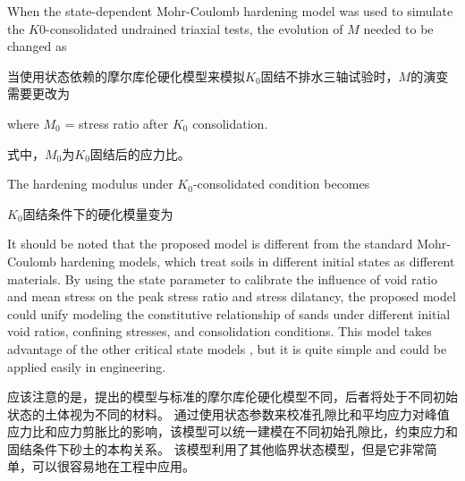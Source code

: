 \begin{ParaColumn}
    
    When the state-dependent Mohr-Coulomb hardening model was used to simulate the $K0$-consolidated undrained triaxial tests, the evolution of $M$ needed to be changed as

    \switchcolumn

    当使用状态依赖的摩尔库伦硬化模型来模拟$K_0$固结不排水三轴试验时，$M$的演变需要更改为

    \switchcolumn*

    \noindent
    where $M_0$ = stress ratio after $K_0$ consolidation.

    \switchcolumn

    \noindent
    式中，$M_0$为$K_0$固结后的应力比。

    \switchcolumn*

    The hardening modulus under $K_0$-consolidated condition becomes

    \switchcolumn

    $K_0$固结条件下的硬化模量变为

    \switchcolumn*

    It should be noted that the proposed model is different from the standard Mohr-Coulomb hardening models, which treat soils in different initial states as different materials. By using the state parameter to calibrate the influence of void ratio and mean stress on the peak stress ratio and stress dilatancy, the proposed model could unify modeling the constitutive relationship of sands under different initial void ratios, confining stresses, and consolidation conditions. This model takes advantage of the other critical state models \citep{Jefferies1993,Wood1994, Li1999, Wan2004,Andrade2008}, but it is quite simple and could be applied easily in engineering.

    \switchcolumn

    应该注意的是，提出的模型与标准的摩尔库伦硬化模型不同，后者将处于不同初始状态的土体视为不同的材料。 通过使用状态参数来校准孔隙比和平均应力对峰值应力比和应力剪胀比的影响，该模型可以统一建模在不同初始孔隙比，约束应力和固结条件下砂土的本构关系。 该模型利用了其他临界状态模型\citep{Jefferies1993,Wood1994, Li1999, Wan2004,Andrade2008}，但是它非常简单，可以很容易地在工程中应用。
\end{ParaColumn}